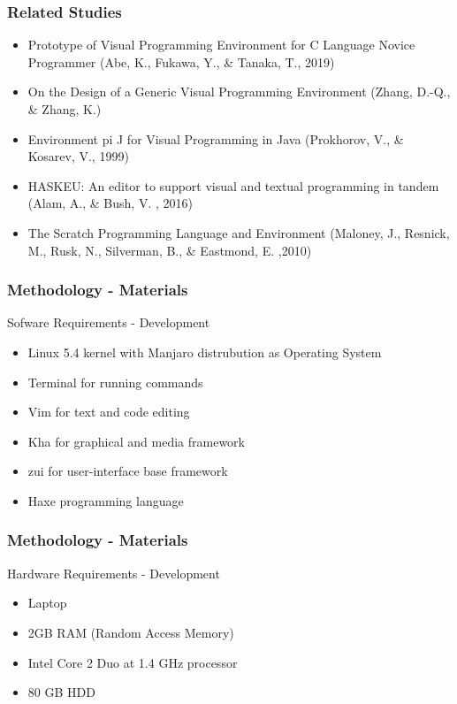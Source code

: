 \documentclass[handout]{beamer}
\begin{document}
\begin{frame}
	\frametitle{Related Studies}
	\begin{itemize}
		\item<1-> Prototype of Visual Programming Environment for C Language Novice Programmer (Abe, K., Fukawa, Y., \& Tanaka, T., 2019)
		\item<2-> On the Design of a Generic Visual Programming Environment (Zhang, D.-Q., \& Zhang, K.)
		\item<3-> Environment pi J for Visual Programming in Java (Prokhorov, V., \& Kosarev, V., 1999)
		\item<4-> HASKEU: An editor to support visual and textual programming in tandem (Alam, A., \& Bush, V. , 2016)
		\item<5-> The Scratch Programming Language and Environment (Maloney, J., Resnick, M., Rusk, N., Silverman, B., \& Eastmond, E. ,2010)
	\end{itemize}
\end{frame}

\begin{frame}
	\frametitle{Methodology - Materials}
	\begin{block}{Sofware Requirements - Development}
		\begin{itemize}
			\item<1-> Linux 5.4 kernel with Manjaro distrubution as Operating System
			\item<2-> Terminal for running commands
			\item<3-> Vim for text and code editing
			\item<4-> Kha for graphical and media framework
			\item<5-> zui for user-interface base framework
			\item<6-> Haxe programming language
		\end{itemize}
	\end{block}
\end{frame}

\begin{frame}
	\frametitle{Methodology - Materials}
	\begin{block}{Hardware Requirements - Development}
		\begin{itemize}
			\item<1-> Laptop
			\item<2-> 2GB RAM (Random Access Memory)
			\item<3-> Intel Core 2 Duo at 1.4 GHz processor
			\item<4-> 80 GB HDD
		\end{itemize}
	\end{block}
\end{frame}
\end{document}
